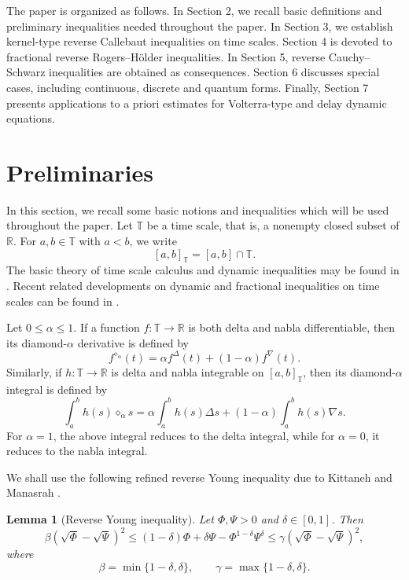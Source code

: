 \documentclass[11pt]{article}
\newtheorem{lemma}[theorem]{Lemma}
\begin{document}
The paper is organized as follows. In Section 2, we recall basic definitions and preliminary inequalities needed throughout the paper. In Section 3, we establish kernel-type reverse Callebaut inequalities on time scales. Section 4 is devoted to fractional reverse Rogers--H\"older inequalities. In Section 5, reverse Cauchy--Schwarz inequalities are obtained as consequences. Section 6 discusses special cases, including continuous, discrete and quantum forms. Finally, Section 7 presents applications to a priori estimates for Volterra-type and delay dynamic equations.

\section{Preliminaries}

In this section, we recall some basic notions and inequalities which will be
used throughout the paper. Let $\mathbb{T}$ be a time scale, that is, a
nonempty closed subset of $\mathbb{R}$. For $a,b\in\mathbb{T}$ with $a<b$, we
write
\[
    [a,b]_{\mathbb{T}}=[a,b]\cap\mathbb{T}.
\]
The basic theory of time scale calculus and dynamic inequalities may be found
in \cite{Hilger1988,BohnerPeterson2001,BohnerPeterson2003,Agarwal2014}.
Recent related developments on dynamic and fractional inequalities on time
scales can be found in \cite{RezkEtAl20XX,SarkarSenSahaHazarika2026,Sahir2025}.

Let $0\leq \alpha\leq 1$. If a function
$f:\mathbb{T}\to\mathbb{R}$ is both delta and nabla differentiable, then its
diamond-$\alpha$ derivative is defined by
\[
    f^{\diamond_{\alpha}}(t)
    =
    \alpha f^{\Delta}(t)+(1-\alpha)f^{\nabla}(t).
\]
Similarly, if $h:\mathbb{T}\to\mathbb{R}$ is delta and nabla integrable on
$[a,b]_{\mathbb{T}}$, then its diamond-$\alpha$ integral is defined by
\[
    \int_a^b h(s)\diamond_{\alpha}s
    =
    \alpha\int_a^b h(s)\Delta s
    +
    (1-\alpha)\int_a^b h(s)\nabla s.
\]
For $\alpha=1$, the above integral reduces to the delta integral, while for
$\alpha=0$, it reduces to the nabla integral.

We shall use the following refined reverse Young inequality due to Kittaneh
and Manasrah \cite{Kittaneh2010,Kittaneh2011}.

\begin{lemma}[Reverse Young inequality]
Let $\Phi,\Psi>0$ and $\delta\in[0,1]$. Then
\[
    \beta\left(\sqrt{\Phi}-\sqrt{\Psi}\right)^2
    \leq
    (1-\delta)\Phi+\delta\Psi-\Phi^{1-\delta}\Psi^{\delta}
    \leq
    \gamma\left(\sqrt{\Phi}-\sqrt{\Psi}\right)^2,
\]
where
\[
    \beta=\min\{1-\delta,\delta\},
    \qquad
    \gamma=\max\{1-\delta,\delta\}.
\]
\end{lemma}
\end{document}
